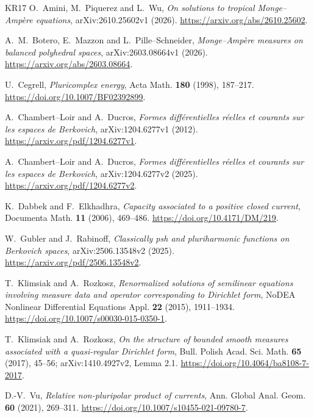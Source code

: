 \documentclass[11pt,reqno]{amsart}
\theoremstyle{definition}
\theoremstyle{remark}
\numberwithin{equation}{section}
\begin{document}
\begin{thebibliography}{KR17}
O.~Amini, M.~Piquerez and L.~Wu,
\emph{On solutions to tropical Monge--Amp\`ere equations},
arXiv:2610.25602v1 (2026).
\url{https://arxiv.org/abs/2610.25602}.

A.~M.~Botero, E.~Mazzon and L.~Pille--Schneider,
\emph{Monge--Amp\`ere measures on balanced polyhedral spaces},
arXiv:2603.08664v1 (2026).
\url{https://arxiv.org/abs/2603.08664}.

U.~Cegrell, \emph{Pluricomplex energy},
Acta Math. \textbf{180} (1998), 187--217.
\url{https://doi.org/10.1007/BF02392899}.

A.~Chambert--Loir and A.~Ducros,
\emph{Formes diff\'erentielles r\'eelles et courants sur les espaces de
Berkovich}, arXiv:1204.6277v1 (2012).
\url{https://arxiv.org/pdf/1204.6277v1}.

A.~Chambert--Loir and A.~Ducros,
\emph{Formes diff\'erentielles r\'eelles et courants sur les espaces de
Berkovich}, arXiv:1204.6277v2 (2025).
\url{https://arxiv.org/pdf/1204.6277v2}.

K.~Dabbek and F.~Elkhadhra,
\emph{Capacity associated to a positive closed current},
Documenta Math. \textbf{11} (2006), 469--486.
\url{https://doi.org/10.4171/DM/219}.

W.~Gubler and J.~Rabinoff,
\emph{Classically psh and pluriharmonic functions on Berkovich spaces},
arXiv:2506.13548v2 (2025).
\url{https://arxiv.org/pdf/2506.13548v2}.

T.~Klimsiak and A.~Rozkosz,
\emph{Renormalized solutions of semilinear equations involving measure
data and operator corresponding to Dirichlet form},
NoDEA Nonlinear Differential Equations Appl. \textbf{22} (2015),
1911--1934.
\url{https://doi.org/10.1007/s00030-015-0350-1}.

T.~Klimsiak and A.~Rozkosz,
\emph{On the structure of bounded smooth measures associated with a
quasi-regular Dirichlet form},
Bull. Polish Acad. Sci. Math. \textbf{65} (2017), 45--56;
arXiv:1410.4927v2, Lemma 2.1.
\url{https://doi.org/10.4064/ba8108-7-2017}.

D.-V.~Vu, \emph{Relative non-pluripolar product of currents},
Ann. Global Anal. Geom. \textbf{60} (2021), 269--311.
\url{https://doi.org/10.1007/s10455-021-09780-7}.


\end{thebibliography}
\end{document}

